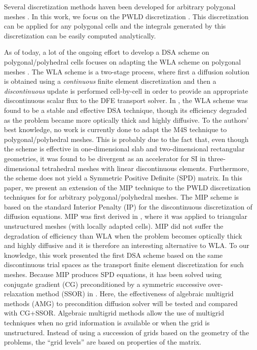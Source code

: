 Several discretization methods haven been developed for 
arbitrary polygonal meshes \cite{pwld_3d,pwl_diffusion,pwbld,palmer_fe,mimetic,
cell_centered_diff,palmer_proc,palmer_ane,pwld_2d,wachspress,cfm_dfm}.
In this work, we focus on the PWLD discretization \cite{pwld_3d,pwld_2d}. This
discretization can be applied for any polygonal cells and the integrals
generated by this discretization can be easily computed analytically. 

As of today, a lot of the ongoing effort to develop a DSA scheme on
polygonal/polyhedral cells focuses on adapting the WLA scheme on polygonal meshes
\cite{wla_pwl,cfm_dfm}. The WLA scheme is a two-stage process, where first a
diffusion solution is obtained using a {\em continuous} finite element
discretization and then a {\em discontinuous } update is performed cell-by-cell 
in order to provide an appropriate discontinuous scalar flux to the DFE transport 
solver. In \cite{consistent_p1}, the WLA scheme was
found to be a stable and effective DSA technique, though its efficiency
degraded as the problem became more optically thick and highly diffusive.
To the authors' best knowledge, no work is currently done to adapt the M4S 
technique to polygonal/polyhedral meshes. This is probably due to the fact
that, even though the scheme is effective in one-dimensional slab and
two-dimensional rectangular geometries, it was found to be divergent as an
accelerator for SI in
three-dimensional tetrahedral meshes with linear discontinuous elements.
Furthermore, the scheme does not yield a Symmetric Positive Definite (SPD)
matrix. In this paper, we present an extension of the MIP technique to the
PWLD discretization techniques for for arbitrary polygonal/polyhedral meshes.
The MIP scheme is based on the standard Interior Penalty (IP) for the
discontinuous discretization of diffusion equations. MIP was first derived in
\cite{mip}, where it was applied to triangular unstructured meshes (with
locally adapted cells). MIP did not suffer the degradation of efficiency 
than WLA when the
problem becomes optically thick and highly diffusive and it is therefore an
interesting alternative to WLA. To our knowledge, this work presented the
first DSA scheme based on the same discontinuous trial spaces as the transport
finite element discretization for such meshes. Because MIP produces SPD
equations, it has been solved using conjugate gradient (CG) preconditioned by
a symmetric successive over-relaxation method (SSOR) in \cite{mip}. Here, the
effectiveness of algebraic multigrid methods (AMG) to precondition diffusion
solver \cite{amg,amg_course} will be tested and compared with CG+SSOR.
Algebraic multigrid methods allow the use of multigrid techniques when no grid
information is available or when the grid is unstructured. Instead of using a
succession of grids based on the geometry of the problems, the ``grid levels''
are based on properties of the matrix.
